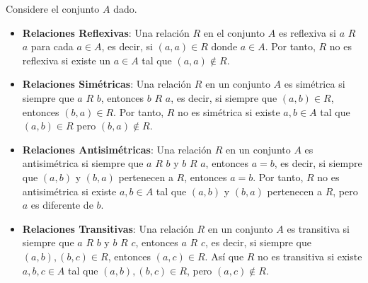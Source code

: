  \noindent  Considere el conjunto $A$ dado.

 \begin{itemize}
    \item \textbf{Relaciones Reflexivas}: Una relación $R$ en el conjunto $A$ es reflexiva si $a$ $R$ $a$ para cada $a \in A$, es decir, si $(a, a) \in R$ donde $a \in A$. Por tanto, $R$ no es reflexiva si existe un $a \in A$ tal que $(a, a) \notin R$.\\


    \item  \textbf{Relaciones Simétricas}: Una relación $R$ en un conjunto $A$ es simétrica si siempre que $a$ $R$ $b$, entonces $b$ $R$ $a$, es decir, si siempre que $(a, b) \in R$, entonces $(b, a) \in R$. Por tanto, $R$ no es simétrica si existe $a, b \in A$ tal que $(a, b) \in R$ pero $(b, a) \notin R$. \\

    \item \textbf{Relaciones Antisimétricas}: Una relación $R$ en un conjunto $A$ es antisimétrica si siempre que $a$ $R$ $b$ y $b$ $R$ $a$, entonces $a = b$, es decir, si siempre que $(a, b)$ y $(b, a)$ pertenecen a $R$, entonces $a = b$. Por tanto, $R$ no es antisimétrica si existe $a, b \in A$ tal que $(a, b)$ y $(b, a)$ pertenecen a $R$, pero $a$ es diferente de $b$. \\

    \item    \textbf{Relaciones Transitivas}: Una relación $R$ en un conjunto $A$ es transitiva si siempre que $a$ $R$ $b$ y $b$ $R$ $c$, entonces $a$ $R$ $c$, es decir, si siempre que $(a, b), (b, c) \in R$, entonces $(a, c) \in R$. Así que $R$ no es transitiva si existe $a, b, c \in A$ tal que $(a, b), (b, c) \in R$, pero $(a, c) \notin R$. \\
\end{itemize}